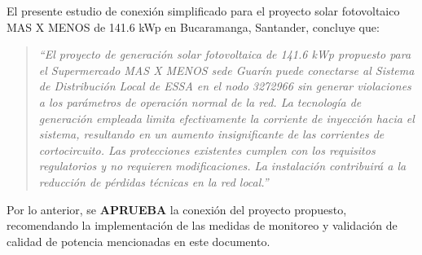 El presente estudio de conexión simplificado para el proyecto solar fotovoltaico MAS X MENOS de 141.6 kWp en Bucaramanga, Santander, concluye que:

\begin{quote}
    \textit{``El proyecto de generación solar fotovoltaica de 141.6 kWp propuesto para el Supermercado MAS X MENOS sede Guarín puede conectarse al Sistema de Distribución Local de ESSA en el nodo 3272966 sin generar violaciones a los parámetros de operación normal de la red. La tecnología de generación empleada limita efectivamente la corriente de inyección hacia el sistema, resultando en un aumento insignificante de las corrientes de cortocircuito. Las protecciones existentes cumplen con los requisitos regulatorios y no requieren modificaciones. La instalación contribuirá a la reducción de pérdidas técnicas en la red local.''}
\end{quote}

Por lo anterior, se \textbf{APRUEBA} la conexión del proyecto propuesto, recomendando la implementación de las medidas de monitoreo y validación de calidad de potencia mencionadas en este documento.
